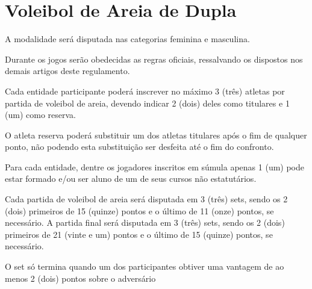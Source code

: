 {\let\clearpage\relax \chapter{Voleibol de Areia de Dupla}}

\begin{article}
	A modalidade será disputada nas categorias feminina e masculina.
\end{article}

\begin{article}
	Durante os jogos serão obedecidas as regras oficiais, ressalvando os dispostos nos demais artigos deste regulamento.
\end{article}

\begin{article}
	Cada entidade participante poderá inscrever no máximo 3 (três) atletas por partida de voleibol de areia, devendo indicar 2 (dois) deles como titulares e 1 (um) como reserva.

	\begin{xparagraph}
		O atleta reserva poderá substituir um dos atletas titulares após o fim de qualquer ponto, não podendo esta substituição ser desfeita até o fim do confronto.
	\end{xparagraph}
	
	\begin{xparagraph}
	    Para cada entidade, dentre os jogadores inscritos em súmula apenas 1 (um) pode estar formado e/ou ser aluno de um de seus cursos não estatutários.
	\end{xparagraph}
\end{article}

\begin{article}
	Cada partida de voleibol de areia será disputada em 3 (três) sets, sendo os 2 (dois) primeiros de 15 (quinze) pontos e o último de 11 (onze) pontos, se necessário. A partida final será disputada em 3 (três) sets, sendo os 2 (dois) primeiros de 21 (vinte e um) pontos e o último de 15 (quinze) pontos, se necessário.

	\begin{xparagraph}
		O set só termina quando um dos participantes obtiver uma vantagem de ao menos 2 (dois) pontos sobre o adversário
	\end{xparagraph}
\end{article}
